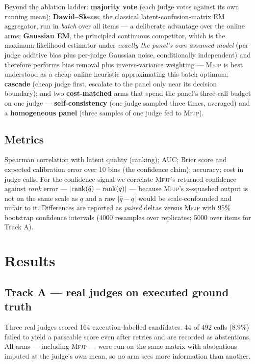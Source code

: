 \documentclass[11pt]{article}
\theoremstyle{definition}
\newcommand{\mfjp}{\textsc{Mfjp}}
\begin{document}
Beyond the ablation ladder: \textbf{majority vote} (each judge votes against its own running
mean); \textbf{Dawid--Skene}, the classical latent-confusion-matrix EM aggregator, run in
\emph{batch} over all items --- a deliberate advantage over the online arms;
\textbf{Gaussian EM}, the principled continuous competitor, which is the maximum-likelihood
estimator under \emph{exactly the panel's own assumed model} (per-judge additive bias plus
per-judge Gaussian noise, conditionally independent) and therefore performs bias removal plus
inverse-variance weighting --- \mfjp{} is best understood as a cheap online heuristic
approximating this batch optimum; \textbf{cascade} (cheap judge first, escalate to the panel
only near its decision boundary); and two \textbf{cost-matched} arms that spend the panel's
three-call budget on one judge --- \textbf{self-consistency} (one judge sampled three times,
averaged) and a \textbf{homogeneous panel} (three samples of one judge fed to \mfjp{}).

\subsection{Metrics}

Spearman correlation with latent quality (ranking); AUC; Brier score and expected calibration
error over 10 bins (the confidence claim); accuracy; cost in judge calls. For the confidence
signal we correlate \mfjp{}'s returned confidence against \emph{rank} error --- $|{\rm
rank}(\hat q)-{\rm rank}(q)|$ --- because \mfjp{}'s z-squashed output is not on the same scale
as $q$ and a raw $|\hat q - q|$ would be scale-confounded and unfair to it. Differences are
reported as \emph{paired} deltas versus \mfjp{} with 95\% bootstrap confidence intervals
(4000 resamples over replicates; 5000 over items for Track A).

\section{Results}

\subsection{Track A --- real judges on executed ground truth}
\label{sec:trackA}

Three real judges scored 164 execution-labelled candidates. $44$ of $492$ calls ($8.9\%$)
failed to yield a parseable score even after retries and are recorded as abstentions. All arms
--- including \mfjp{} --- were run on the same matrix with abstentions imputed at the judge's
own mean, so no arm sees more information than another.
\end{document}

